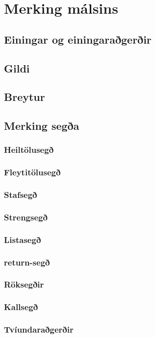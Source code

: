 \documentclass[12pt,a4paper]{article}
\begin{document}
\section{Merking málsins}
\subsection{Einingar og einingaraðgerðir}
\subsection{Gildi}
\subsection{Breytur}
\subsection{Merking segða}
\subsubsection{Heiltölusegð}
\subsubsection{Fleytitölusegð}
\subsubsection{Stafsegð}
\subsubsection{Strengsegð}
\subsubsection{Listasegð}
\subsubsection{return-segð}
\subsubsection{Röksegðir}
\subsubsection{Kallsegð}
\subsubsection{Tvíundaraðgerðir}
\end{document}
